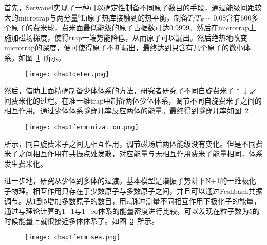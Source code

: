 首先，Serwanel实现了一种可以确定性制备不同原子数目的手段，通过能级间距较大的microtrap与两分量${}^6$Li原子热库接触到的热平衡，制备$T/T_F\sim0.08$含有600多个原子的费米球，费米面最低能级的原子占据数可达0.9999。然后在microtrap上施加磁场梯度，使得trap一端势能降低，从而原子可以漏出。然后绝热地改变microtrap的深度，便可使得原子不断漏出，最终达到只含有几个原子的微小体系。如图~\ref{deter}~所示。
\begin{figure}[!htbp]
    \centering
    \texttt{[image: chap1deter.png]}
    \label{deter}
\end{figure}

然后，借助上面精确制备少体体系的方法，研究者研究了不同自旋费米子$\uparrow\downarrow$之间费米化的过程。在准一维trap中制备两体少体体系，调节不同自旋费米子之间的相互作用。通过少体体系隧穿几率反应两体的能量。最终得到隧穿几率如图~\ref{ferminization}~
\begin{figure}[!htbp]
    \centering
    \texttt{[image: chap1ferminization.png]}
    \label{ferminization}
\end{figure}
所示，同自旋费米子之间无相互作用，调节磁场后两体能级没有变化。但是不同费米子之间相互作用在共振点处发散，对应能量与无相互作用费米子能量相同，体系发生费米化。


进一步地，研究从少体到多体的过渡。基本模型是谐振子势阱下N+1的一维极化子物理。相互作用只存在于少数原子与多数原子之间，并且可以通过Feshbach共振调节。从1到5增加多数原子的数目，用rf脉冲测量不同相互作用下极化子的能量，通过与理论计算的1+1与1+$\infty$体系的能量密度进行比较，可以发现在粒子数为5的时候能量上就很接近多体体系了。如图~\ref{fermisea}~所示。
\begin{figure}[!htbp]
    \centering
    \texttt{[image: chap1fermisea.png]}
    \label{fermisea}
\end{figure}

